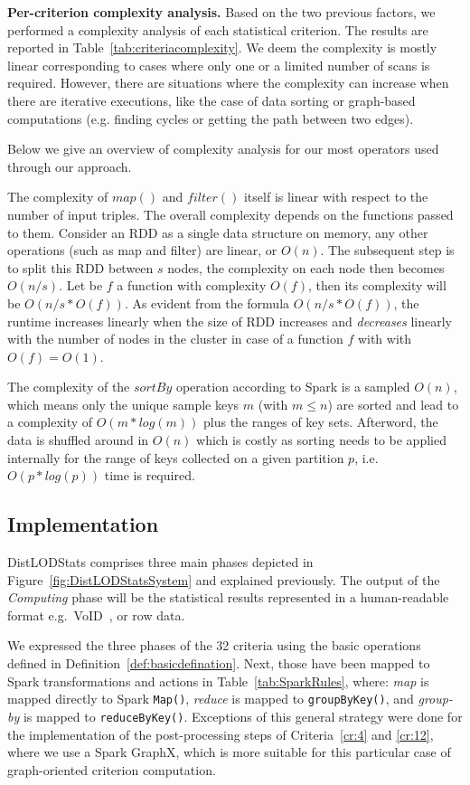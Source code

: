 \noindent
\textbf{Per-criterion complexity analysis.} Based on the two previous factors, we performed a complexity analysis of each statistical criterion. The results are reported in Table~\ref{tab:criteriacomplexity}. 
We deem the complexity is mostly linear corresponding to cases where only one or a limited number of scans is required. 
However, there are situations where the complexity can increase when there are iterative executions, like the case of data sorting or graph-based computations (e.g. finding cycles or getting the path between two edges).

\noindent
Below we give an overview of complexity analysis for our most operators used through our approach.

The complexity of $map()$ and $filter()$ itself is linear with respect to the number of input triples.
The overall complexity depends on the functions passed to them. 
Consider an \gls{RDD} as a single data structure on memory, any other operations (such as map and filter) are linear, or $O(n)$. 
The subsequent step is to split this \gls{RDD} between $s$ nodes, the complexity on each node then becomes $O(n/s)$.
Let be $f$ a function with complexity $O(f)$, then its complexity will be $O(n/s * O(f))$.
As evident from the formula $O(n/s * O(f))$, the runtime increases linearly when the size of \gls{RDD} increases and \emph{decreases} linearly with the number of nodes in the cluster in case of a function $f$ with with $O(f)=O(1)$.

The complexity of the $sortBy$ operation according to Spark is a sampled $O(n)$, which means only the unique sample keys $m$ (with $m \le n$) are sorted and lead to a complexity of $O(m*log(m))$ plus the ranges of key sets. 
Afterword, the data is shuffled around in $O(n)$ which is costly as sorting needs to be applied internally for the range of keys collected on a given partition $p$, i.e.~$O(p*log(p))$ time is required.

\subsection{Implementation}
\label{subsection:implementation}
DistLODStats comprises three main phases depicted in Figure~\ref{fig:DistLODStatsSystem} and explained previously.
The output of the \emph{Computing} phase will be the statistical results represented in a human-readable format e.g.~VoID~\cite{Zhao:11:VoID}, or row data.

We expressed the three phases of the 32 criteria using the basic operations defined in Definition~\ref{def:basicdefination}.
Next, those have been mapped to Spark transformations and actions in Table~\ref{tab:SparkRules}, where: \textit{map} is mapped directly to Spark \verb|Map()|, \textit{reduce} is mapped to \verb|groupByKey()|, and \textit{group-by} is mapped to \verb|reduceByKey()|.
Exceptions of this general strategy were done for the implementation of the post-processing steps of Criteria~\ref{cr:4} and \ref{cr:12}, where we use a Spark GraphX, which is more suitable for this particular case of graph-oriented criterion computation.


